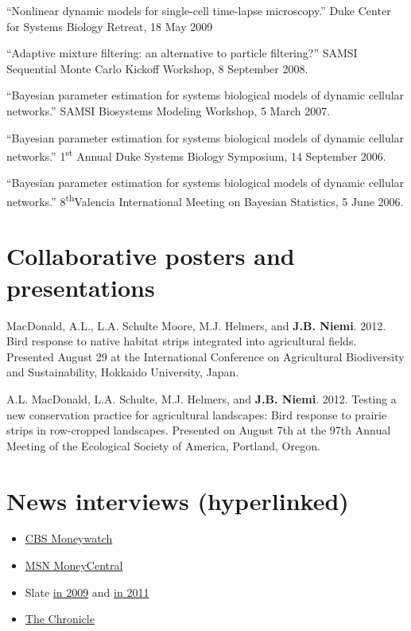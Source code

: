 \documentclass[overlapped,line,letterpaper]{res}
\begin{document}
\begin{resume}
{``Nonlinear dynamic models for single-cell time-lapse microscopy.'' Duke Center for Systems Biology Retreat, 18 May 2009

``Adaptive mixture filtering: an alternative to particle filtering?'' SAMSI Sequential Monte Carlo Kickoff Workshop, 8 September 2008.

``Bayesian parameter estimation for systems biological models of dynamic cellular networks.'' SAMSI Biosystems Modeling Workshop, 5 March 2007.

``Bayesian parameter estimation for systems biological models of dynamic cellular networks.'' 1\textsuperscript{st} Annual Duke Systems Biology Symposium, 14 September 2006.

``Bayesian parameter estimation for systems biological models of dynamic cellular networks.'' 8\textsuperscript{th}Valencia International Meeting on Bayesian Statistics, 5 June 2006.

}

\section{Collaborative posters and presentations}


MacDonald, A.L., L.A. Schulte Moore, M.J. Helmers, and {\bf J.B. Niemi}.  2012.  Bird response to native habitat strips integrated into agricultural fields.  Presented August 29 at the International Conference on Agricultural Biodiversity and Sustainability, Hokkaido University, Japan.  

A.L. MacDonald, L.A. Schulte, M.J. Helmers, and {\bf J.B. Niemi}.  2012.  Testing a new conservation practice for agricultural landscapes: Bird response to prairie strips in row-cropped landscapes.  Presented on August 7th at the 97th Annual Meeting of the Ecological Society of America, Portland, Oregon.

\section{\bf News interviews (hyperlinked)}

	\begin{itemize}
	\item[] \href{http://moneywatch.bnet.com/economic-news/article/ncaa-brackets-how-to-win-your-march-madness-pool/403055/?tag=main;related-link-0}{CBS Moneywatch}
	\item[] \href{http://articles.moneycentral.msn.com/SmartSpending/blog/page.aspx?post=1704157}{MSN MoneyCentral}
	\item[] Slate \href{http://www.slate.com/id/2213974/pagenum/all/}{in 2009} and \href{http://www.slate.com/id/2288234/pagenum/all/}{in 2011}
	\item[] \href{http://dukechronicle.com/node/145805}{The Chronicle}
	\end{itemize}




\end{resume}
\end{document}

